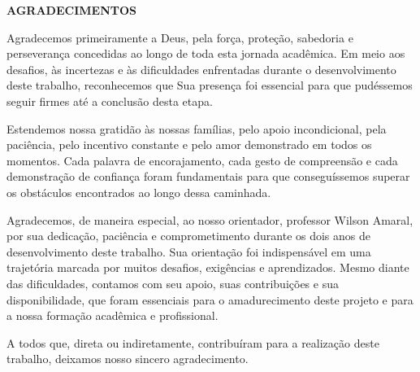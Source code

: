 ﻿%
\newpage
\thispagestyle{empty}
\begin{center}
  {\bfseries AGRADECIMENTOS}
\end{center}
\vspace{1cm}
\justifying

Agradecemos primeiramente a Deus, pela força, proteção, sabedoria e perseverança concedidas ao longo de toda esta jornada acadêmica. Em meio aos desafios, às incertezas e às dificuldades enfrentadas durante o desenvolvimento deste trabalho, reconhecemos que Sua presença foi essencial para que pudéssemos seguir firmes até a conclusão desta etapa.

Estendemos nossa gratidão às nossas famílias, pelo apoio incondicional, pela paciência, pelo incentivo constante e pelo amor demonstrado em todos os momentos. Cada palavra de encorajamento, cada gesto de compreensão e cada demonstração de confiança foram fundamentais para que conseguíssemos superar os obstáculos encontrados ao longo dessa caminhada.

Agradecemos, de maneira especial, ao nosso orientador, professor Wilson Amaral, por sua dedicação, paciência e comprometimento durante os dois anos de desenvolvimento deste trabalho. Sua orientação foi indispensável em uma trajetória marcada por muitos desafios, exigências e aprendizados. Mesmo diante das dificuldades, contamos com seu apoio, suas contribuições e sua disponibilidade, que foram essenciais para o amadurecimento deste projeto e para a nossa formação acadêmica e profissional.

A todos que, direta ou indiretamente, contribuíram para a realização deste trabalho, deixamos nosso sincero agradecimento.


